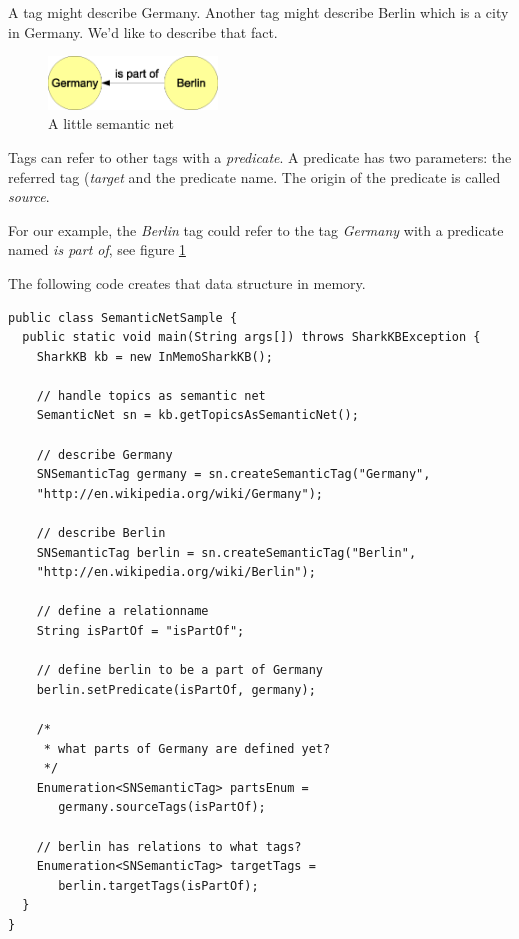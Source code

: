 A tag might describe Germany. Another tag might describe Berlin which is a city in Germany. We'd like to describe that fact.

\begin{figure}[t]
\centering
\includegraphics[width=0.40\textwidth]{semanticNet.eps}
\caption{A little semantic net}
\label{fig:semanticNet}
\end{figure}

Tags can refer to other tags with a {\it predicate}. A predicate has two parameters: the referred tag ({\it target} and the predicate name. The origin of the predicate is called {\it source}. 

For our example, the {\it Berlin} tag could refer to the tag {\it Germany} with a predicate named {\it is part of}, see figure \ref{fig:semanticNet}

The following code creates that data structure in memory.

\begin{verbatim}
public class SemanticNetSample {
  public static void main(String args[]) throws SharkKBException {
    SharkKB kb = new InMemoSharkKB();
        
    // handle topics as semantic net
    SemanticNet sn = kb.getTopicsAsSemanticNet();
        
    // describe Germany
    SNSemanticTag germany = sn.createSemanticTag("Germany", 
    "http://en.wikipedia.org/wiki/Germany");
        
    // describe Berlin
    SNSemanticTag berlin = sn.createSemanticTag("Berlin", 
    "http://en.wikipedia.org/wiki/Berlin");
        
    // define a relationname
    String isPartOf = "isPartOf";

    // define berlin to be a part of Germany
    berlin.setPredicate(isPartOf, germany);
        
    /* 
     * what parts of Germany are defined yet?
     */ 
    Enumeration<SNSemanticTag> partsEnum = 
       germany.sourceTags(isPartOf);
        
    // berlin has relations to what tags?
    Enumeration<SNSemanticTag> targetTags = 
       berlin.targetTags(isPartOf);
  }       
}

\end{verbatim}

